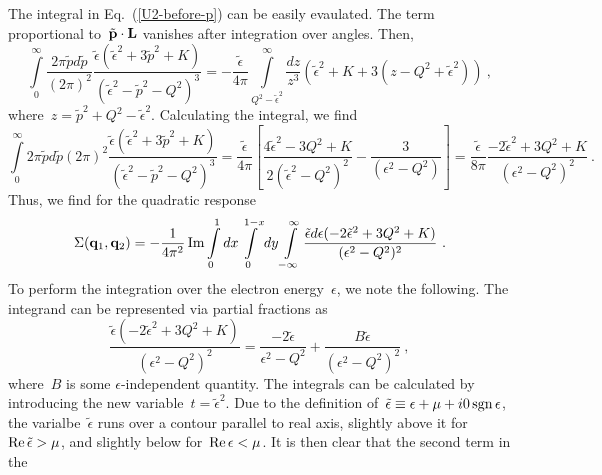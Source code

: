 \documentclass[preprint,aps,prb]{revtex4}
\begin{document}
The integral in Eq.~(\ref{U2-before-p}) can be easily evaulated. 
The term proportional to~$\tilde{\bf p} \cdot {\bf L}$ vanishes 
after integration over angles. Then, 
\begin{equation}
\int\limits_{0}^{\infty} \frac{2\pi \tilde{p} d\tilde{p}}{(2\pi)^2} 
\frac{\tilde{\epsilon}(\tilde{\epsilon}^2 + 3{\tilde p}^2 + K)}{
(\tilde\epsilon^2 - \tilde{p}^2 - Q^2)^3
}
= - \frac{\tilde{\epsilon}}{4\pi}
\int\limits_{Q^2 - \tilde\epsilon^2}^{\infty} 
\frac{dz}{z^3} \left(\tilde\epsilon^2 + K + 3 (z - Q^2 + \tilde\epsilon^2)\right)
\ , 
\end{equation}
where~$z = \tilde{p}^2 + Q^2  - \tilde\epsilon^2$. Calculating the
integral, we find
\begin{equation}
\int\limits_{0}^{\infty} {2\pi \tilde{p} d\tilde{p}}{(2\pi)^2}
\frac{\tilde{\epsilon}(\tilde{\epsilon}^2 + 3{\tilde p}^2 + K)}{
(\tilde\epsilon^2 - \tilde{p}^2 - Q^2)^3
}
= \frac{\tilde\epsilon}{4\pi}
\left[
\frac{4\tilde\epsilon^2 - 3Q^2 + K}{2 (\tilde\epsilon^2 - Q^2)^2}
- \frac{3}{(\epsilon^2 - Q^2)}
\right]
= \frac{\tilde\epsilon}{8\pi}
\frac{-2\tilde\epsilon^2 + 3 Q^2 + K}{(\epsilon^2 - Q^2)^2}
\ .
\end{equation}
Thus, we find for the quadratic response
\begin{equation}
\Sigma({\bf q}_1, {\bf q}_2) 
= - \frac{1}{4\pi^2} \mathop{\rm Im}\nolimits
\int\limits_{0}^{1}dx
\int\limits_{0}^{1-x}dy
\int\limits_{-\infty}^{\infty} 
\frac{\tilde\epsilon d\epsilon (-2\tilde\epsilon^2 + 3 Q^2 + K)}{
   (\epsilon^2 - Q^2)^2}
\ .
\end{equation}
To perform the integration over the electron energy~$\epsilon$, 
we note the following. The integrand can be represented via partial
fractions as
\begin{equation}
\label{U2-partial-fractions}
\frac{\tilde\epsilon (-2\tilde\epsilon^2 + 3 Q^2 + K)}{
    (\epsilon^2 - Q^2)^2}
    = \frac{-2 \tilde\epsilon}{\epsilon^2 - Q^2} 
    + \frac{B\tilde\epsilon}{(\epsilon^2 - Q^2)^2}
\ , 
\end{equation}
where~$B$ is some $\epsilon$-independent quantity. 
The integrals can be calculated by introducing the new variable~$t = 
\tilde\epsilon^2$.
Due to the definition of~$\tilde\epsilon \equiv \epsilon + \mu + 
i 0 \mathop{\rm sgn}\epsilon$, the varialbe~$\tilde\epsilon$
runs over a contour parallel to real axis, slightly above it
for~$\mathop{\rm Re}\nolimits \tilde \epsilon > \mu$, 
and slightly below for~$\mathop{\rm Re}\nolimits \epsilon < \mu$. 
It is then clear that the second term in the
\end{document}
